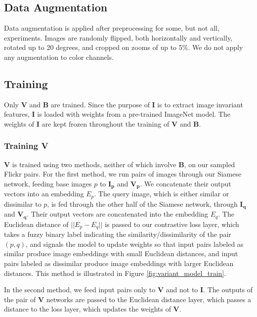 \subsection{Data Augmentation}
Data augmentation is applied after preprocessing for some, but not all, experiments. Images are randomly flipped, both horizontally and vertically,  rotated up to 20 degrees, and cropped on zooms of up to 5\%. We do not apply any augmentation to color channels.


\subsection{Training}
Only $\mathbf{V}$ and $\mathbf{B}$ are trained. Since the purpose of $\mathbf{I}$ is to extract image invariant features,  $\mathbf{I}$ is loaded with weights from a pre-trained ImageNet model. The weights of $\mathbf{I}$ are kept frozen throughout the training of $\mathbf{V}$ and $\mathbf{B}$.

\subsubsection{Training V}
$\mathbf{V}$ is trained using two methods, neither of which involve $\mathbf{B}$, on our sampled Flickr pairs. For the first method, we run pairs of images through our Siamese network, feeding base images $p$ to $\mathbf{I_p}$ and $\mathbf{V_p}$. We concatenate their output vectors into an embedding $E_p$. The query image, which is either similar or dissimilar to $p$, is fed through the other half of the Siamese network, through $\mathbf{I_q}$ and $\mathbf{V_q}$. Their output vectors are concatenated into the embedding $E_q$. The Euclidean distance of $||E_p - E_q||$ is passed to our contrastive loss layer, which takes a fuzzy binary label indicating the similarity/dissimilarity of the pair $(p, q)$, and signals the model to update weights so that input pairs labeled as similar produce image embeddings with small Euclidean distances, and input pairs labeled as dissimilar produce image embeddings with larger Euclidean distances. This method is illustrated in Figure \ref{fig:variant_model_train}.

In the second method, we feed input pairs only to $\mathbf{V}$ and not to $\mathbf{I}$. The outputs of the pair of $\mathbf{V}$ networks are passed to the Euclidean distance layer, which passes a distance to the loss layer, which updates the weights of $\mathbf{V}$. 

